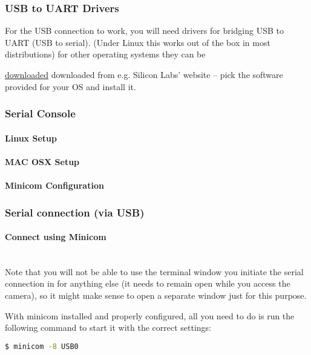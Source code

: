 \subsubsection{USB to UART Drivers}

For the USB connection to work, you will need drivers for bridging USB to UART (USB to serial). (Under Linux this works out of the box in most 	distributions) for other operating systems they can be 

\hyperlink{https://www.silabs.com/products/development-tools/software/usb-to-uart-bridge-vcp-drivers}{downloaded}
downloaded from e.g. Silicon Labs' website – pick the software provided for your OS and install it. \\

\subsubsection{Serial Console}
\paragraph{Linux Setup}
\paragraph{MAC OSX Setup}
\paragraph{Minicom Configuration}
\subsubsection{Serial connection (via USB)}
\paragraph{Connect using Minicom}\mbox{}\\
Note that you will not be able to use the terminal window you initiate the serial connection in for anything else (it needs to remain open while you access the camera), so it might make sense to open a separate window just for this purpose.

With minicom installed and properly configured, all you need to do is run the following command to start it with the correct settings:

\begin{lstlisting}[language=bash,morekeywords=$,keywordstyle=\bfseries,frame=none,xleftmargin=.25in,belowskip=2em, aboveskip=2em]
$ minicom -8 USB0
\end{lstlisting}

